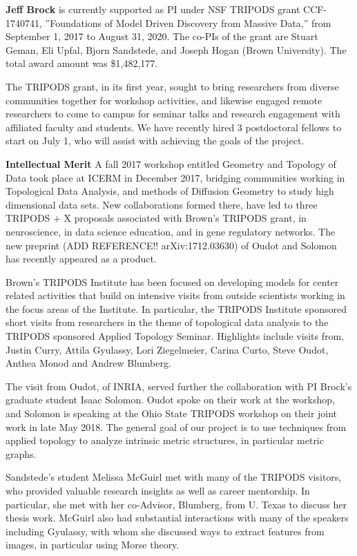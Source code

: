 

\textbf{Jeff Brock} is currently supported as PI under NSF TRIPODS grant CCF-1740741, ''Foundations of Model Driven Discovery from Massive Data,'' from September 1, 2017 to August 31, 2020. The co-PIs of the grant are Stuart Geman, Eli Upfal, Bjorn Sandstede, and Joseph Hogan (Brown University). The total award amount was \$1,482,177.

The TRIPODS grant, in its first year, sought to bring researchers from diverse communities together for workshop activities, and likewise engaged remote researchers to come to campus for seminar talks and research engagement with affiliated faculty and students. We have recently hired 3 postdoctoral fellows to start on July 1, who will assist with achieving the goals of the project.

\textbf{Intellectual Merit} A fall 2017 workshop entitled Geometry and Topology of Data took place at ICERM in December 2017, bridging communities working in Topological Data Analysis, and methods of Diffusion Geometry to study high dimensional data sets. New collaborations formed there, have led to three  TRIPODS + X proposals associated with Brown's TRIPODS grant, in neuroscience, in data science education, and in gene regulatory networks. The new preprint (ADD REFERENCE!! arXiv:1712.03630) of Oudot and Solomon has recently appeared as a product.

Brown's TRIPODS Institute has been focused on developing models for center related activities that build on intensive visits from outside scientists working in the focus areas of the Institute. In particular, the TRIPODS Institute sponsored short visits from researchers in the theme of topological data analysis to the TRIPODS sponsored Applied Topology Seminar. Highlights include visits from, Justin Curry, Attila Gyulassy, Lori Ziegelmeier, Carina Curto, Steve Oudot, Anthea Monod and Andrew Blumberg.

The visit from Oudot, of INRIA, served further the collaboration with PI Brock's graduate student Isaac Solomon. Oudot spoke on their work at the workshop, and Solomon is speaking at the Ohio State TRIPODS workshop on their joint work in late May 2018. The general goal of our project is to use techniques from applied topology to analyze intrinsic metric structures, in particular metric graphs.

Sandstede's student Melissa McGuirl met with many of the TRIPODS visitors, who provided valuable research insights as well as career mentorship. In particular, she met with her co-Advisor, Blumberg, from U. Texas to discuss her thesis work. McGuirl also had substantial interactions with many of the speakers including Gyulassy, with whom she discussed ways to extract features from images, in particular using Morse theory. 

